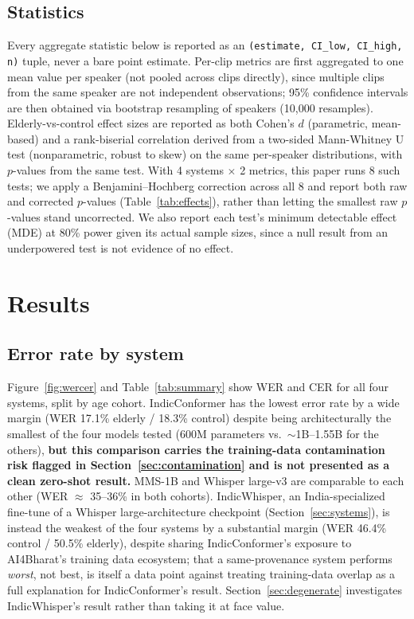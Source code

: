 \documentclass[11pt]{article}
\begin{document}
\subsection{Statistics}
\label{sec:stats}

Every aggregate statistic below is reported as an \texttt{(estimate, CI\_low, CI\_high, n)} tuple,
never a bare point estimate.
Per-clip metrics are first aggregated to one mean value per speaker (not pooled across clips
directly), since multiple clips from the same speaker are not independent observations; 95\%
confidence intervals are then obtained via bootstrap resampling of speakers (10,000 resamples).
Elderly-vs-control effect sizes are reported as both Cohen's $d$ (parametric, mean-based) and a
rank-biserial correlation derived from a two-sided Mann-Whitney U test (nonparametric, robust to
skew) on the same per-speaker distributions, with $p$-values from the same test. With 4 systems
$\times$ 2 metrics, this paper runs 8 such tests; we apply a Benjamini--Hochberg correction across
all 8 and report both raw and corrected $p$-values (Table~\ref{tab:effects}), rather than letting
the smallest raw $p$-values stand uncorrected. We also report each test's minimum detectable
effect (MDE) at 80\% power given its actual sample sizes, since a null result from an
underpowered test is not evidence of no effect.

\section{Results}

\subsection{Error rate by system}

Figure~\ref{fig:wercer} and Table~\ref{tab:summary} show WER and CER for all four systems, split
by age cohort. IndicConformer has the lowest error rate by a wide margin (WER 17.1\% elderly /
18.3\% control) despite being architecturally the smallest of the four models tested (600M
parameters vs.\ $\sim$1B--1.55B for the others), \textbf{but this comparison carries the
training-data contamination risk flagged in Section~\ref{sec:contamination} and is not presented
as a clean zero-shot result.} MMS-1B and Whisper large-v3 are comparable to each other (WER
$\approx$ 35--36\% in both cohorts). IndicWhisper, an India-specialized fine-tune of a
Whisper large-architecture checkpoint (Section~\ref{sec:systems}), is instead the weakest of the
four systems by a substantial margin (WER 46.4\% control / 50.5\% elderly), despite sharing
IndicConformer's exposure to AI4Bharat's training data ecosystem; that a same-provenance system
performs \emph{worst}, not best, is itself a data point against treating training-data overlap as
a full explanation for IndicConformer's result. Section~\ref{sec:degenerate} investigates
IndicWhisper's result rather than taking it at face value.
\end{document}
